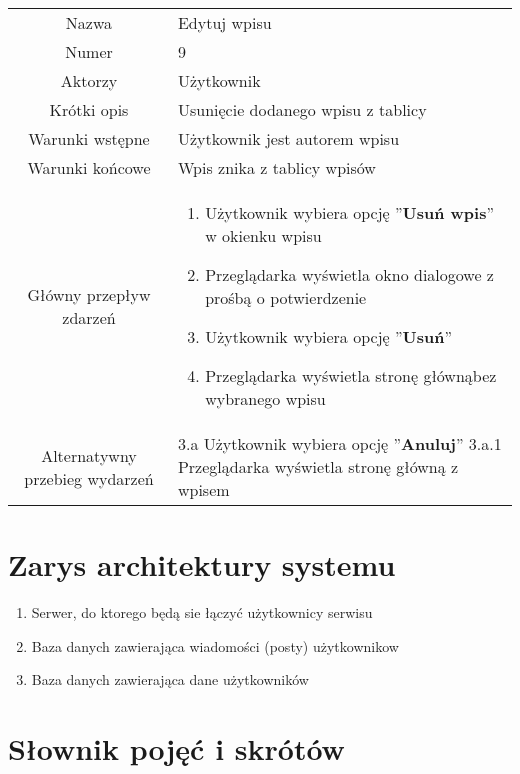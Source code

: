 \documentclass[a4paper]{article}
\begin{document}
\begin{tabular}{c p{10cm}}
Nazwa& Edytuj wpisu\\
Numer	& 9\\
Aktorzy &	Użytkownik\\
Krótki opis & Usunięcie dodanego wpisu z tablicy\\
Warunki wstępne& Użytkownik jest autorem wpisu\\
Warunki końcowe& Wpis znika z tablicy wpisów\\
Główny przepływ zdarzeń&
\begin{enumerate}
\item Użytkownik wybiera opcję ''\textbf{Usuń wpis}'' w okienku wpisu
\item Przeglądarka wyświetla okno dialogowe z prośbą o potwierdzenie
\item Użytkownik wybiera opcję ''\textbf{Usuń}''
\item Przeglądarka wyświetla stronę głównąbez wybranego wpisu
\end{enumerate} \\

Alternatywny przebieg wydarzeń & 
3.a Użytkownik wybiera opcję ''\textbf{Anuluj}'' \newline 
3.a.1 Przeglądarka wyświetla stronę główną z wpisem
\\
\hline
\end{tabular}


\section{Zarys architektury systemu}
\begin{enumerate}
\item Serwer, do ktorego będą sie łączyć użytkownicy serwisu
\item Baza danych zawierająca wiadomości (posty) użytkownikow
\item Baza danych zawierająca dane użytkowników
\end{enumerate}


\section{Słownik pojęć i skrótów}

\begin{tabular}{|p{3cm}| p{7cm}|}
\hline
\hline

\hline
\end{tabular}
\end{document}
